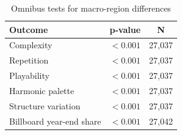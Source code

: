 \begin{table}[H]
\centering
\caption{Omnibus tests for macro-region differences}
\label{tab:geo_tests}
\begin{tabular}{lcc}
\toprule
Outcome & p-value & N \\
\midrule
Complexity & $<0.001$ & 27,037 \\
Repetition & $<0.001$ & 27,037 \\
Playability & $<0.001$ & 27,037 \\
Harmonic palette & $<0.001$ & 27,037 \\
Structure variation & $<0.001$ & 27,037 \\
Billboard year-end share & $<0.001$ & 27,042 \\
\bottomrule
\end{tabular}
\end{table}
